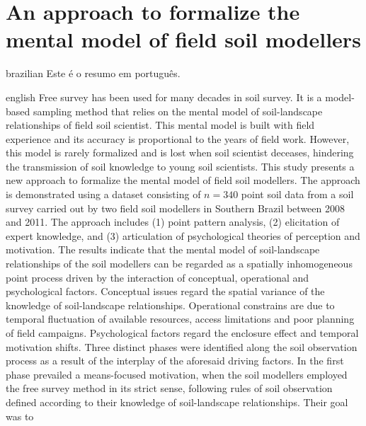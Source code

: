 \artigotrue
\chapter{An approach to formalize the mental model of field soil modellers}
\label{chap:chap06}

\def\ptkeys{}

\begin{chapterabstract}{brazilian}{\portuguesekeys}
Este é o resumo em português.
\end{chapterabstract}

\def\enkeys{Digital soil mapping, Free survey, Point pattern analysis, Expert knowledge, Means-focused 
motivation}
  
\begin{chapterabstract}{english}{\englishkeys}
Free survey has been used for many decades in soil survey. It is a model-based sampling method that relies on 
the mental model of soil-landscape relationships of field soil scientist. This mental model is built with 
field experience and its accuracy is proportional to the years of field work. However, this model is rarely 
formalized and is lost when soil scientist deceases, hindering the transmission of soil knowledge to young 
soil scientists. This study presents a new approach to formalize the mental model of field soil modellers. The 
approach is demonstrated using a dataset consisting of $n = 340$ point soil data from a soil survey carried 
out by two field soil modellers in Southern Brazil between 2008 and 2011. The approach includes (1) point 
pattern analysis, (2) elicitation of expert knowledge, and (3) articulation of psychological theories 
of perception and motivation. The results indicate that the mental model of soil-landscape relationships of 
the soil modellers can be regarded as a spatially inhomogeneous point process driven by the interaction of 
conceptual, operational and psychological factors. Conceptual issues regard the spatial variance of the 
knowledge of soil-landscape relationships. Operational constrains are due to temporal fluctuation of available 
resources, access limitations and poor planning of field campaigns. Psychological factors regard the enclosure 
effect and temporal motivation shifts. Three distinct phases were identified along the soil observation 
process as a result of the interplay of the aforesaid driving factors. In the first phase prevailed a 
means-focused 
motivation, when the soil modellers employed the free survey method in its strict sense, following rules of 
soil observation defined according to their knowledge of soil-landscape relationships. Their goal was to 

\end{chapterabstract}

